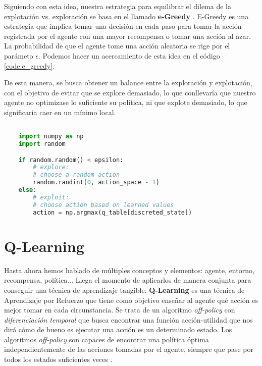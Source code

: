 Siguiendo con esta idea, nuestra estrategia para equilibrar el dilema de la explotación vs. exploración se basa en el llamado \textbf{e-Greedy} \citep{Tokic:egreedy}. E-Greedy es una estrategia que implica tomar una decisión en cada paso para tomar la acción registrada por el agente con una mayor recompensa o tomar una acción al azar. La probabilidad de que el agente tome una acción aleatoria se rige por el parámeto \( \epsilon \). Podemos hacer un acercamiento de esta idea en el código \ref{code:e_greedy}.

De esta manera, se busca obtener un balance entre la exploración y explotación, con el objetivo de evitar que se explore demasiado, lo que conllevaría que nuestro agente no optimizase lo suficiente su política, ni que explote demasiado, lo que significaría caer en un mínimo local.

\begin{minipage}{0.9\linewidth}%
    \begin{lstlisting}[frame=tb, language=Python, caption=Pseudocódigo e-Greedy, label={code:e_greedy}]

    import numpy as np
    import random

    if random.random() < epsilon:
        # explore:
        # choose a random action
        random.randint(0, action_space - 1)
    else:
        # exploit:
        # choose action based on learned values
        action = np.argmax(q_table[discreted_state])
    \end{lstlisting}%
\end{minipage}

\section{Q-Learning}

Hasta ahora hemos hablado de múltiples conceptos y elementos: agente, entorno, recompensa, política... Llega el momento de aplicarlos de manera conjunta para conseguir una técnica de aprendizaje tangible. \textbf{Q-Learning} es una técnica de Aprendizaje por Refuerzo que tiene como objetivo enseñar al agente qué acción es mejor tomar en cada circunstancia. Se trata de un algoritmo \textit{off-policy} con \textit{diferenciación temporal} que busca encontrar una función acción-utilidad que nos dirá cómo de bueno es ejecutar una acción es un determinado estado. Los algoritmos \textit{off-policy} son capaces de encontrar una política óptima independientemente de las acciones tomadas por el agente, siempre que pase por todos los estados suficientes veces \citep{PooleMackworth17}.

